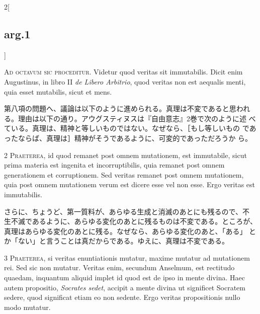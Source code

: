 \documentclass[paper=a4paper,fontsize=10pt,jafontsize=9pt,titlepage]{jlreq}
\begin{document}
\begin{paracol}{2}[\subsection{arg.1}]


{\huge A}{\scshape d octavum sic proceditur}. Videtur quod veritas sit
immutabilis. Dicit enim Augustinus, in libro II {\itshape de Libero
Arbitrio}, quod veritas non est aequalis menti, quia esset mutabilis,
sicut et mens.

\switchcolumn

第八項の問題へ、議論は以下のように進められる。真理は不変であると思われ
る。理由は以下の通り。アウグスティヌスは『自由意志』2巻で次のように述
べている。真理は、精神と等しいものではない。なぜなら、［もし等しいもの
であったならば、真理は］精神がそうであるように、可変的であっただろうか
ら。



{\scshape 2 Praeterea}, id quod remanet post omnem mutationem, est
immutabile, sicut prima materia est ingenita et incorruptibilis, quia
remanet post omnem generationem et corruptionem. Sed veritas remanet
post omnem mutationem, quia post omnem mutationem verum est dicere
esse vel non esse. Ergo veritas est immutabilis.

\switchcolumn

さらに、ちょうど、第一質料が、あらゆる生成と消滅のあとにも残るので、不
生不滅であるように、あらゆる変化のあとに残るものは不変である。ところが、
真理はあらゆる変化のあとに残る。なぜなら、あらゆる変化のあと、「ある」
とか「ない」と言うことは真だからである。ゆえに、真理は不変である。



{\scshape 3 Praeterea}, si veritas enuntiationis mutatur, maxime
mutatur ad mutationem rei. Sed sic non mutatur. Veritas enim, secundum
Anselmum, est rectitudo quaedam, inquantum aliquid implet id quod est
de ipso in mente divina. Haec autem propositio, {\itshape Socrates
sedet}, accipit a mente divina ut significet Socratem sedere, quod
significat etiam eo non sedente. Ergo veritas propositionis nullo modo
mutatur.


\end{paracol}
\end{document}

